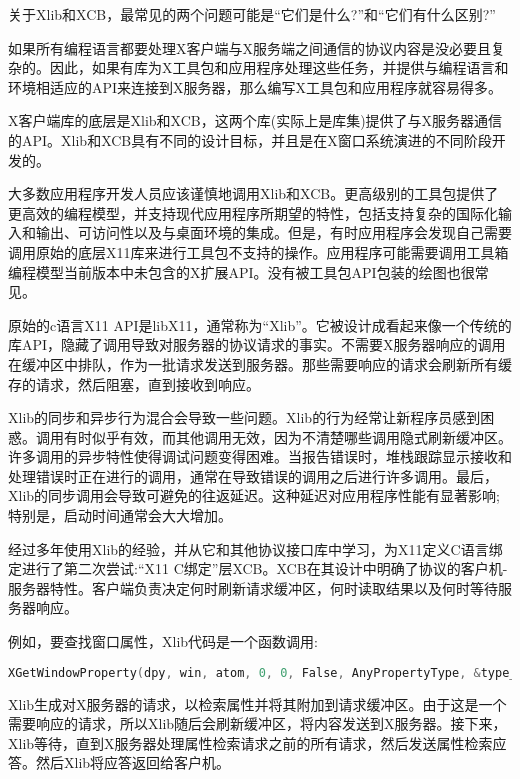 关于Xlib和XCB，最常见的两个问题可能是“它们是什么?”和“它们有什么区别?”

如果所有编程语言都要处理X客户端与X服务端之间通信的协议内容是没必要且复杂的。因此，如果有库为X工具包和应用程序处理这些任务，并提供与编程语言和环境相适应的API来连接到X服务器，那么编写X工具包和应用程序就容易得多。

X客户端库的底层是Xlib和XCB，这两个库(实际上是库集)提供了与X服务器通信的API。Xlib和XCB具有不同的设计目标，并且是在X窗口系统演进的不同阶段开发的。

大多数应用程序开发人员应该谨慎地调用Xlib和XCB。更高级别的工具包提供了更高效的编程模型，并支持现代应用程序所期望的特性，包括支持复杂的国际化输入和输出、可访问性以及与桌面环境的集成。但是，有时应用程序会发现自己需要调用原始的底层X11库来进行工具包不支持的操作。应用程序可能需要调用工具箱编程模型当前版本中未包含的X扩展API。没有被工具包API包装的绘图也很常见。

原始的c语言X11 API是libX11，通常称为“Xlib”。它被设计成看起来像一个传统的库API，隐藏了调用导致对服务器的协议请求的事实。不需要X服务器响应的调用在缓冲区中排队，作为一批请求发送到服务器。那些需要响应的请求会刷新所有缓存的请求，然后阻塞，直到接收到响应。

Xlib的同步和异步行为混合会导致一些问题。Xlib的行为经常让新程序员感到困惑。调用有时似乎有效，而其他调用无效，因为不清楚哪些调用隐式刷新缓冲区。许多调用的异步特性使得调试问题变得困难。当报告错误时，堆栈跟踪显示接收和处理错误时正在进行的调用，通常在导致错误的调用之后进行许多调用。最后，Xlib的同步调用会导致可避免的往返延迟。这种延迟对应用程序性能有显著影响;特别是，启动时间通常会大大增加。

经过多年使用Xlib的经验，并从它和其他协议接口库中学习，为X11定义C语言绑定进行了第二次尝试:“X11 C绑定”层XCB。XCB在其设计中明确了协议的客户机-服务器特性。客户端负责决定何时刷新请求缓冲区，何时读取结果以及何时等待服务器响应。


\noindent 例如，要查找窗口属性，Xlib代码是一个函数调用:

\begin{lstlisting}[language=C]
XGetWindowProperty(dpy, win, atom, 0, 0, False, AnyPropertyType, &type_ret, &format_ret, &num_ret, &bytes_after, &prop_ret);
\end{lstlisting}

\noindent Xlib生成对X服务器的请求，以检索属性并将其附加到请求缓冲区。由于这是一个需要响应的请求，所以Xlib随后会刷新缓冲区，将内容发送到X服务器。接下来，Xlib等待，直到X服务器处理属性检索请求之前的所有请求，然后发送属性检索应答。然后Xlib将应答返回给客户机。


